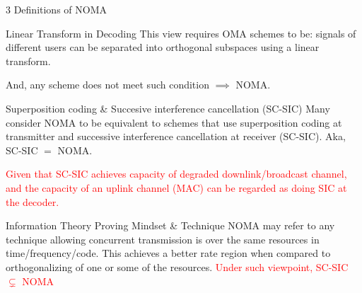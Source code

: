 \documentclass[aspectratio=43, 10pt]{beamer}
\begin{document}
   \begin{frame}[t]{3 Definitions of NOMA}
   \vspace{-1.3em}
        \begin{block}{Linear Transform in Decoding}
        This view requires OMA schemes to be: signals of different users can be separated into orthogonal subspaces using a linear transform. 
        
        And, any scheme does not meet such condition $\implies$ NOMA.
      \end{block}
      
      \pause
      \vspace{-0.7em}
      \begin{block}{Superposition coding \& Succesive interference cancellation (SC-SIC)}
          Many consider NOMA to be equivalent to schemes that use superposition coding at transmitter and successive interference cancellation at receiver (SC-SIC). Aka, SC-SIC $=$ NOMA. 
          
          \textcolor{red}{Given that SC-SIC achieves capacity of degraded downlink/broadcast channel, and the capacity of an uplink channel (MAC) can be regarded as doing SIC at the decoder.}
      \end{block}

      \pause 
       \vspace{-0.7em}
      \begin{block}{Information Theory Proving Mindset \& Technique}
        NOMA may refer to any technique allowing concurrent transmission is  over the same resources in time/frequency/code. This achieves a better rate region when compared to orthogonalizing of one or some of the resources. 
        \textcolor{red}{Under such viewpoint, SC-SIC $\subsetneq$ NOMA}
      \end{block}
  \end{frame}



  
\end{document}
